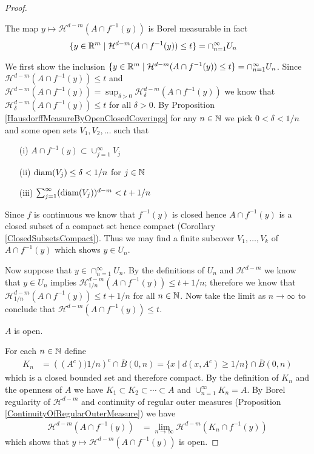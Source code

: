 \begin{proof}
\begin{clm}The map $y \mapsto \mathcal{H}^{d-m}(A \cap f^{-1}(y))$ is Borel measurable in fact
\begin{align*}
\lbrace y \in \mathbb{R}^m \mid \mathcal{H}^{d-m}(A \cap f^{-1}(y)) \leq t \rbrace &= \cap_{n=1}^\infty U_n
\end{align*}
\end{clm}
We first show the inclusion $\lbrace y \in \mathbb{R}^m \mid \mathcal{H}^{d-m}(A \cap f^{-1}(y)) \leq t \rbrace = \cap_{n=1}^\infty U_n$.
Since $\mathcal{H}^{d-m}(A \cap f^{-1}(y)) \leq t$ and $\mathcal{H}^{d-m}(A \cap f^{-1}(y)) = \sup_{\delta>0} \mathcal{H}_\delta^{d-m}(A \cap f^{-1}(y))$ we know that
$\mathcal{H}_\delta^{d-m}(A \cap f^{-1}(y)) \leq t$ for all $\delta > 0$.  By Proposition \ref{HausdorffMeasureByOpenClosedCoverings} for any $n \in \mathbb{N}$ we pick $0 < \delta < 1/n$ and some open sets $V_1, V_2, \dotsc$ such that
\begin{itemize}
\item[(i)] $A \cap f^{-1}(y) \subset \cup_{j=1}^\infty V_j$
\item[(ii)] $\operatorname*{diam}(V_j) \leq \delta < 1/n$ for $j \in \mathbb{N}$
\item[(iii)] $\sum_{j=1}^\infty (\operatorname*{diam}(V_j))^{d-m} < t + 1/n$
\end{itemize}
Since $f$ is continuous we know that $f^{-1}(y)$ is closed hence $A \cap f^{-1}(y)$ is a closed subset of a compact set hence compact (Corollary \ref{ClosedSubsetsCompact}).  Thus we may find
a finite subcover $V_1, \dotsc, V_k$ of $A \cap f^{-1}(y)$ which shows $y \in U_n$.  

Now suppose that $y \in \cap_{n=1}^\infty U_n$.  By the definitions of $U_n$ and $\mathcal{H}^{d-m}$ we know that $y \in U_n$ implies $\mathcal{H}_{1/n}^{d-m}(A \cap f^{-1}(y)) \leq t + 1/n$; therefore we know that $\mathcal{H}_{1/n}^{d-m}(A \cap f^{-1}(y)) \leq t + 1/n$ for all $n \in \mathbb{N}$.  Now take the limit as $n \to \infty$ to conclude that $\mathcal{H}^{d-m}(A \cap f^{-1}(y)) \leq t$.

\begin{cas} $A$ is open.
\end{cas}

For each $n \in \mathbb{N}$ define 
\begin{align*}
K_n &= \left((A^c)){1/n}\right)^c \cap \overline{B}(0,n) = \lbrace x \mid d(x,A^c) \geq 1/n \rbrace \cap \overline{B}(0,n)
\end{align*}
which is a closed bounded set and therefore compact.  By the definition of $K_n$ and the openness of $A$ we have $K_1 \subset K_2 \subset \dotsb \subset A$ and $\cup_{n=1}^\infty K_n = A$.  By Borel regularity of $\mathcal{H}^{d-m}$ 
and continuity of regular outer measures  (Proposition \ref{ContinuityOfRegularOuterMeasure}) we have
\begin{align*}
\mathcal{H}^{d-m} (A \cap f^{-1}(y)) &= \lim_{n \to \infty} \mathcal{H}^{d-m} (K_n \cap f^{-1}(y))
\end{align*}
which shows that $y \mapsto \mathcal{H}^{d-m} (A \cap f^{-1}(y))$ is open.


\end{proof}
